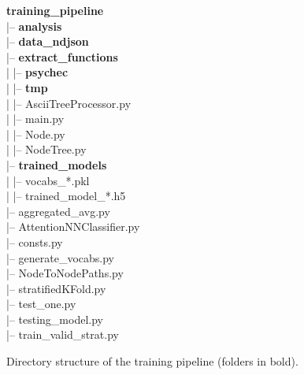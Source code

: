 \documentclass[10pt,english,a4paper]{report}
\begin{document}
\begin{figure}[H]
    \centering
    \begin{minipage}{\textwidth}
    \ttfamily %
    \textbf{training\_pipeline} \\
    |-- \textbf{analysis} \\
    |-- \textbf{data\_ndjson} \\
    |-- \textbf{extract\_functions} \\
    |   |-- \textbf{psychec} \\
    |   |-- \textbf{tmp} \\
    |   |-- AsciiTreeProcessor.py \\
    |   |-- main.py \\
    |   |-- Node.py \\
    |   |-- NodeTree.py \\
    |-- \textbf{trained\_models} \\
    |   |-- vocabs\_*.pkl \\
    |   |-- trained\_model\_*.h5 \\
    |-- aggregated\_avg.py \\
    |-- AttentionNNClassifier.py \\
    |-- consts.py \\
    |-- generate\_vocabs.py \\
    |-- NodeToNodePaths.py \\
    |-- stratifiedKFold.py \\
    |-- test\_one.py \\
    |-- testing\_model.py \\
    |-- train\_valid\_strat.py \\
    \end{minipage}
    \caption{Directory structure of the training pipeline (folders in bold).}
    \label{fig:training_pipeline_structure}
\end{figure}
\end{document}
